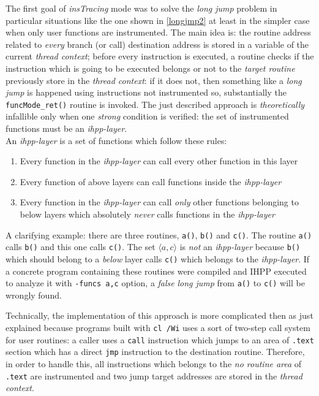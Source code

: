 \documentclass[a4paper,10pt]{report}
\begin{document}
The first goal of \emph{insTracing} mode was to solve the \emph{long jump} 
problem in particular situations like the one shown in \cref{longjmp2} 
at least in the simpler case when only user functions are instrumented. 
The main idea is: the routine address related to \emph{every} branch (or call) 
destination address is stored in a variable of the current \emph{thread context}; 
before every instruction is executed, a routine checks if the instruction
which is going to be executed belongs or not to the \emph{target routine} 
previously store in the \emph{thread context}: if it does not, then something
like a \emph{long jump} is happened using instructions not instrumented so,
substantially the \verb|funcMode_ret()| routine is invoked. The just described 
approach is \emph{theoretically} infallible only when one \emph{strong} condition
is verified: the set of instrumented functions must be an \emph{ihpp-layer}.\\
An \emph{ihpp-layer} is a set of functions which follow these rules:
\begin{enumerate}
\item Every function in the \emph{ihpp-layer} can call every other function in this layer
\item Every function of above layers can call functions inside the \emph{ihpp-layer}
\item Every function in the \emph{ihpp-layer} can call \emph{only} other functions
belonging to below layers which absolutely \emph{never} calls functions
in the \emph{ihpp-layer}
\end{enumerate}

\noindent
A clarifying example: there are three routines, \verb|a()|, \verb|b()| and \verb|c()|.
The routine \verb|a()| calls \verb|b()| and this one calls \verb|c()|.
The set $\langle a,c\rangle$ is \emph{not} an \emph{ihpp-layer} because \verb|b()| which should belong to a \emph{below} layer calls \verb|c()| which belongs to the \emph{ihpp-layer}. If a concrete program containing these routines were compiled and IHPP executed
to analyze it with \verb|-funcs a,c| option, a \emph{false} \emph{long jump} from 
\verb|a()| to \verb|c()| will be wrongly found.

Technically, the implementation of this approach is more complicated then
as just explained because programs built with \verb|cl /Wi| uses
a sort of two-step call system for user routines: 
a caller uses a \verb|call| instruction which jumps to 
an area of \verb|.text| section which has a direct \verb|jmp| instruction
to the destination routine. Therefore, in order to handle this, all
instructions which belongs to the \emph{no routine area} of \verb|.text| are instrumented
and two jump target addresses are stored in the \emph{thread context}.
\end{document}

